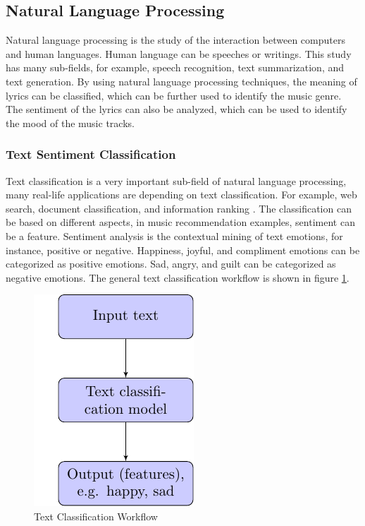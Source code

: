 \subsection{Natural Language Processing}

Natural language processing is the study of the interaction between computers and human languages. Human language can be speeches or writings. This study has many sub-fields, for example, speech recognition, text summarization, and text generation. By using natural language processing techniques, the meaning of lyrics can be classified, which can be further used to identify the music genre. The sentiment of the lyrics can also be analyzed, which can be used to identify the mood of the music tracks.

\subsubsection{Text Sentiment Classification}

Text classification is a very important sub-field of natural language processing, many real-life applications are depending on text classification. For example, web search, document classification, and information ranking \cite{joulin2016bag}. The classification can be based on different aspects, in music recommendation examples, sentiment can be a feature. Sentiment analysis is the contextual mining of text emotions, for instance, positive or negative. Happiness, joyful, and compliment emotions can be categorized as positive emotions. Sad, angry, and guilt can be categorized as negative emotions. The general text classification workflow is shown in figure \ref{tcworkflow}.

\begin{figure}[htbp]
\centering
\includegraphics[width=2.5 in]{images/tcworkflow}
\caption{Text Classification Workflow}
\label{tcworkflow}
\end{figure}

